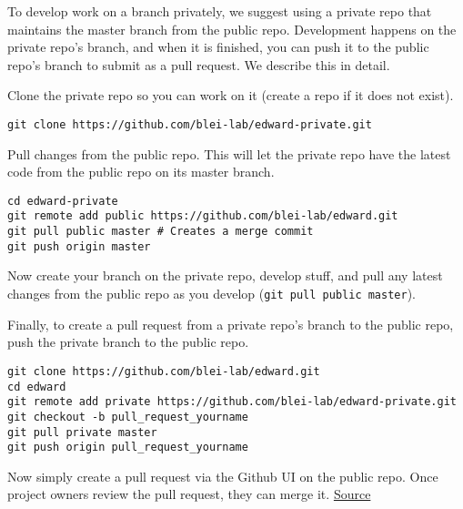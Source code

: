 To develop work on a branch privately, we suggest using a private repo
that maintains the master branch from the public repo. Development
happens on the private repo's branch, and when it is finished, you can
push it to the public repo's branch to submit as a pull request. We
describe this in detail.

Clone the private repo so you can work on it (create a repo if it does
not exist).

\begin{lstlisting}[class=JSON]
git clone https://github.com/blei-lab/edward-private.git
\end{lstlisting}

Pull changes from the public repo. This will let the private repo have
the latest code from the public repo on its master branch.

\begin{lstlisting}[class=JSON]
cd edward-private
git remote add public https://github.com/blei-lab/edward.git
git pull public master # Creates a merge commit
git push origin master
\end{lstlisting}

Now create your branch on the private repo, develop stuff, and pull any
latest changes from the public repo as you develop
(\texttt{git\ pull\ public\ master}).

Finally, to create a pull request from a private repo's branch to the
public repo, push the private branch to the public repo.

\begin{lstlisting}[class=JSON]
git clone https://github.com/blei-lab/edward.git
cd edward
git remote add private https://github.com/blei-lab/edward-private.git
git checkout -b pull_request_yourname
git pull private master
git push origin pull_request_yourname
\end{lstlisting}

Now simply create a pull request via the Github UI on the public repo.
Once project owners review the pull request, they can merge it.
\href{http://stackoverflow.com/questions/10065526/github-how-to-make-a-fork-of-public-repository-private/30352360\#30352360}{Source}
